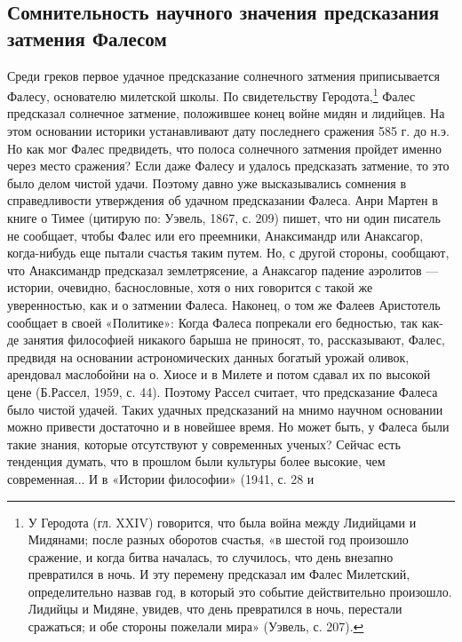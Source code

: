 \subsection{Сомнительность  научного  значения  предсказания  затмения
Фалесом}

Среди   греков  первое   удачное   предсказание  солнечного   затмения
приписывается  Фалесу, основателю  милетской  школы. По  свидетельству
Геродота,\footnote{У  Геродота (гл.  XXIV) говорится,  что была  война
между Лидийцами и  Мидянами; после разных оборотов  счастья, «в шестой
год  произошло  сражение,  и   когда  битва  началась,  то  случилось,
что  день  внезапно превратился  в  ночь.  И эту  перемену  предсказал
им  Фалес   Милетский,  определительно  назвав  год,   в  который  это
событие действительно  произошло. Лидийцы  и Мидяне, увидев,  что день
превратился в ночь, перестали сражаться;  и обе стороны пожелали мира»
(Уэвель,  с. 207).}  Фалес предсказал  солнечное затмение,  положившее
конец войне мидян и лидийцев. На этом основании историки устанавливают
дату последнего сражения  585 г. до н.э. Но как  мог Фалес предвидеть,
что полоса  солнечного затмения  пройдет именно через  место сражения?
Если  даже  Фалесу  и  удалось   предсказать  затмение,  то  это  было
делом  чистой  удачи.  Поэтому  давно  уже  высказывались  сомнения  в
справедливости утверждения об удачном предсказании Фалеса. Анри Мартен
в книге о Тимее (цитирую по: Уэвель,  1867, с. 209) пишет, что ни один
писатель  не  сообщает, чтобы  Фалес  или  его преемники,  Анаксимандр
или  Анаксагор, когда-нибудь  еще пытали  счастья таким  путем. Но,  с
другой стороны, сообщают, что  Анаксимандр предсказал землетрясение, а
Анаксагор падение аэролитов ---  истории, очевидно, баснословные, хотя
о них  говорится с  такой же  уверенностью, как  и о  затмении Фалеса.
Наконец, о том же Фалеев Аристотель сообщает в своей «Политике»: Когда
Фалеса попрекали его бедностью, так как-де занятия философией никакого
барыша  не приносят,  то, рассказывают,  Фалес, предвидя  на основании
астрономических данных богатый урожай  оливок, арендовал маслобойни на
о.  Хиосе и  в Милете  и потом  сдавал их  по высокой  цене (Б.Рассел,
1959, с.  44). Поэтому  Рассел считает,  что предсказание  Фалеса было
чистой удачей.  Таких удачных предсказаний на  мнимо научном основании
можно  привести  достаточно и  в  новейшее  время.  Но может  быть,  у
Фалеса были  такие знания,  которые отсутствуют у  современных ученых?
Сейчас  есть  тенденция думать,  что  в  прошлом были  культуры  более
высокие, чем  современная... И  в «Истории философии»  (1941, с.  28 и
